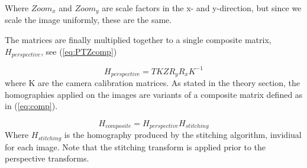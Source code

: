 	Where $Zoom_x$ and $Zoom_y$ are scale factors in the x- and y-direction, but since we scale the image uniformly, these are the same.

	The matrices are finally multiplied together to a single composite matrix, $H_{perspective}$, see (\ref{eq:PTZcomp})

	\begin{equation}
		H_{perspective}=TKZR_yR_xK^{-1}
		\label{eq:PTZcomp}
	\end{equation}
	where K are the camera calibration matrices.
	As stated in the theory section, the homographies applied on the images are variants of a composite matrix defined as in (\ref{eq:comp}).

	\begin{equation}
		H_{composite}=H_{perspective}H_{stitching}
		\label{eq:comp}
	\end{equation}
	Where $H_{stitching}$ is the homography produced by the stitching algorithm, invidiual for each image. Note that the stitching transform is applied prior to the perspective transforms. %
